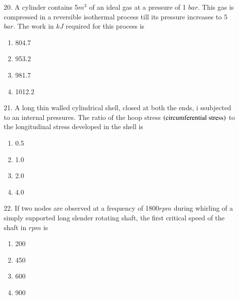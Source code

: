 \documentclass[journal,12pt,onecolumn]{IEEEtran}
\theoremstyle{remark}
\begin{document}
\begin{enumerate}
    \item[20.] A cylinder contains 5$m^3$ of an ideal gas at a pressure of 1 $bar$. This gas is
        compressed in a reversible isothermal process till its pressure increases to 5 $bar$. The
        work in $kJ$ required for this process is
        \hfill{}
        \begin{multicols}{4}
            \begin{enumerate}
                \item 804.7 \columnbreak
                \item 953.2 \columnbreak
                \item 981.7 \columnbreak
                \item 1012.2
            \end{enumerate}
        \end{multicols}

    \item[21.] A long thin walled cylindrical shell, closed at both the ends, i ssubjected to an 
        internal pressures. The ratio of the hoop stress $\left(\textnormal{circumferential stress}\right)$
        to the longitudinal stress developed in the shell is
        \hfill{}
        \begin{multicols}{4}
            \begin{enumerate}
                \item 0.5 \columnbreak
                \item 1.0 \columnbreak
                \item 2.0 \columnbreak
                \item 4.0
            \end{enumerate}
        \end{multicols}

    \item[22.] If two nodes are observed at a frequency of  1800$rpm$ during whirling of a simply
        supported long slender rotating shaft, the first critical speed of the shaft in $rpm$ is
        \hfill{}
        \begin{multicols}{4}
            \begin{enumerate}
                \item 200\columnbreak
                \item 450 \columnbreak
                \item 600 \columnbreak
                \item 900
            \end{enumerate}
        \end{multicols}


\end{enumerate}
\end{document}
